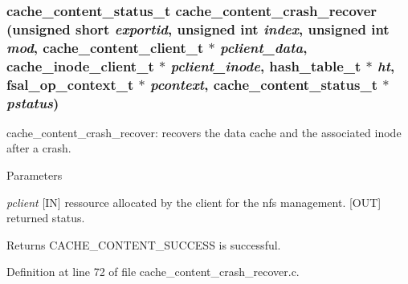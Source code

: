\subsubsection[{cache\_\-content\_\-crash\_\-recover}]{\setlength{\rightskip}{0pt plus 5cm}cache\_\-content\_\-status\_\-t cache\_\-content\_\-crash\_\-recover (unsigned short {\em exportid}, \/  unsigned int {\em index}, \/  unsigned int {\em mod}, \/  cache\_\-content\_\-client\_\-t $\ast$ {\em pclient\_\-data}, \/  cache\_\-inode\_\-client\_\-t $\ast$ {\em pclient\_\-inode}, \/  hash\_\-table\_\-t $\ast$ {\em ht}, \/  fsal\_\-op\_\-context\_\-t $\ast$ {\em pcontext}, \/  cache\_\-content\_\-status\_\-t $\ast$ {\em pstatus})}\label{cache__content__crash__recover_8c_a263b98e54e97309e6e4681f23b161e18}
cache\_\-content\_\-crash\_\-recover: recovers the data cache and the associated inode after a crash.


\begin{DoxyParams}{Parameters}
\item[{\em pclient}][IN] ressource allocated by the client for the nfs management.  [OUT] returned status.\end{DoxyParams}
\begin{DoxyReturn}{Returns}
CACHE\_\-CONTENT\_\-SUCCESS is successful. 
\end{DoxyReturn}


Definition at line 72 of file cache\_\-content\_\-crash\_\-recover.c.